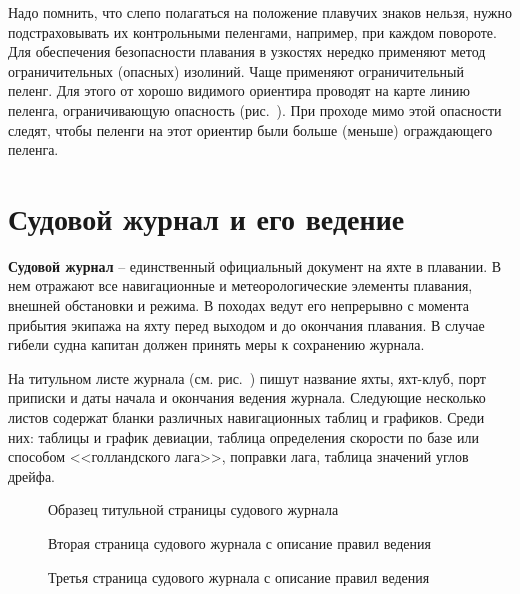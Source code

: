 Надо помнить, что слепо полагаться на положение плавучих знаков нельзя, нужно подстраховывать их контрольными пеленгами, например, при каждом повороте. Для обеспечения безопасности плавания в узкостях нередко применяют метод ограничительных (опасных) изолиний. Чаще применяют ограничительный пеленг. Для этого от хорошо видимого ориентира проводят на карте линию пеленга, ограничивающую опасность (рис.~). При проходе мимо этой опасности следят, чтобы пеленги на этот ориентир были больше (меньше) ограждающего пеленга. 

\section{Судовой журнал и его ведение}

\textbf{Судовой журнал} \--- единственный официальный документ на яхте в плавании. В нем отражают все навигационные и метеорологические элементы плавания, внешней обстановки и режима. В походах ведут его непрерывно с момента прибытия экипажа на яхту перед выходом и до окончания плавания. В случае гибели судна капитан должен принять меры к сохранению журнала.
 
На титульном листе журнала (см. рис.~) пишут название яхты, яхт-клуб, порт приписки и даты начала и окончания ведения журнала. Следующие несколько листов содержат бланки различных навигационных таблиц и графиков. Среди них: таблицы и график девиации, таблица определения скорости по базе или способом <<голландского лага>>, поправки лага, таблица значений углов дрейфа.

\begin{figure}[htb]
  \centering{}
  \caption{Образец титульной страницы судового журнала}
  \label{fig:j-title}
\end{figure} 

\begin{figure}[htb]
  \begin{minipage}{0.49\textwidth}
    \centering{}
    \caption{Вторая страница судового журнала с описание правил ведения}
    \label{fig:j-page-1}
  \end{minipage}
  \hfill\hfill
  \begin{minipage}{0.49\textwidth}
    \centering{}
    \caption{Третья страница судового журнала с описание правил ведения}
    \label{fig:j-page-2}
  \end{minipage}
\end{figure} 

